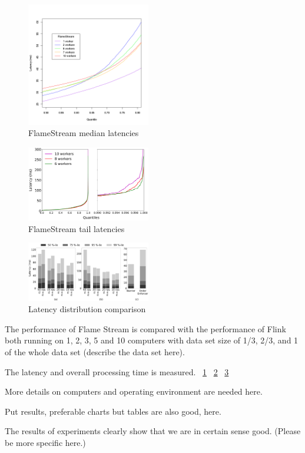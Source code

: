 
\label {fs-experiments-section}

\begin{figure}[htbp]
  \centering
  \includegraphics[width=0.48\textwidth]{pics/fs-index-median}
  \caption{FlameStream median latencies}
  \label {fs-index-median}
\end{figure}

\begin{figure}[htbp]
  \centering
  \includegraphics[width=0.48\textwidth]{pics/fs-index-quantiles}
  \caption{FlameStream tail latencies}
  \label {fs-index-quantiles}
\end{figure}

\begin{figure}[htbp]
  \centering
  \includegraphics[width=0.48\textwidth]{pics/comp-index-quantiles}
  \caption{Latency distribution comparison}
  \label {comp-index-quantiles}
\end{figure}

The performance of Flame Stream is compared with the  performance of Flink both running on 1, 2, 3, 5 and 10 computers with data set size of 1/3, 2/3, and 1 of the whole data set  (describe the data set here).

The latency and overall processing time is measured. 
~\ref{fs-index-median}
~\ref{fs-index-quantiles}
~\ref{comp-index-quantiles}

More details on computers and operating environment are needed here.

Put results, preferable charts but tables are also good, here.

The results of experiments clearly show that we are in certain sense good.  (Please be more specific here.)

